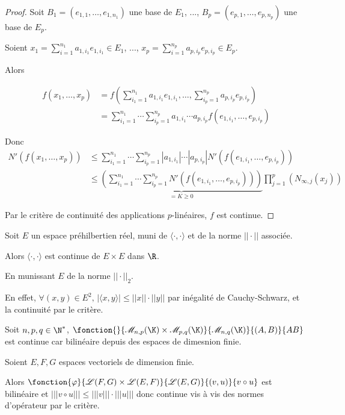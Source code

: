 \begin{proof}
    Soit $B_1 = (e_{1, 1}, \ldots, e_{1, n_1})$ une base de $E_1$, ..., $B_p = (e_{p, 1}, \ldots, e_{p, n_p})$ une base de $E_p$.

    Soient $\displaystyle x_1 = \sum_{i=1}^{n_1} a_{1, i_1} e_{1, i_1} \in E_1$, ..., $\displaystyle x_p = \sum_{i=1}^{n_p} a_{p, i_p} e_{p, i_p} \in E_p$.

    Alors 
    
    \begin{align*}
        f(x_1, \ldots, x_p) & = f\left( \sum_{i_1=1}^{n_1} a_{1, i_1} e_{1, i_1}, \ldots, \sum_{i_p=1}^{n_p} a_{p, i_p} e_{p, i_p} \right) \\
        & = \sum_{i_1=1}^{n_1} \cdots \sum_{i_p=1}^{n_p} a_{1, i_1} \cdots a_{p, i_p} f(e_{1, i_1}, \ldots, e_{p, i_p}) 
    \end{align*}

    Donc 
    \begin{align*}
        N'(f(x_1, \ldots, x_p)) & \leqslant \sum_{i_1=1}^{n_1} \cdots \sum_{i_p=1}^{n_p} |a_{1, i_1}| \cdots |a_{p, i_p}| N'(f(e_{1, i_1}, \ldots, e_{p, i_p})) \\
        & \leqslant \underbrace{\left( \sum_{i_1=1}^{n_1} \cdots \sum_{i_p=1}^{n_p} N'(f(e_{1, i_1}, \ldots, e_{p, i_p})) \right)}_{ = K \geqslant 0} \prod_{j=1}^p \left( N_{\infty, j}(x_j) \right)
    \end{align*}

    Par le critère de continuité des applications $p$-linéaires, $f$ est continue.
\end{proof}

\begin{exemple}
    Soit $E$ un espace préhilbertien réel, muni de $\langle \cdot, \cdot \rangle$ et de la norme $||\cdot||$ associée.

    Alors $\langle \cdot, \cdot\rangle$ est continue de $E \times E$ dans $\R$. 

    En munissant $E$ de la norme $||\cdot||_2$. 

    En effet, $\forall (x, y) \in E^2, \, |\langle x, y\rangle| \leqslant ||x|| \cdot ||y||$ par inégalité de Cauchy-Schwarz,
    et la continuité par le critère. 

    \lvspace Soit $n, p, q \in \N^*$, $\fonction{}{\mathscr M_{n, p}(\K) \times \mathscr M_{p, q}(\K)}{\mathscr M_{n, q}(\K)}{(A, B)}{AB}$ est
    continue car bilinéaire depuis des espaces de dimesnion finie. 


    \lvspace Soient $E, F, G$ espaces vectoriels de dimension finie.
    
    Alors $\fonction{\varphi}{\mathscr L(F, G) \times \mathscr L(E, F)}{\mathscr L(E, G)}{(v, u)}{v \circ u}$ est bilinéaire
    et $||| v \circ u||| \leqslant |||v||| \cdot |||u|||$ donc continue vis à vis des normes d'opérateur par 
    le critère. 
\end{exemple}


